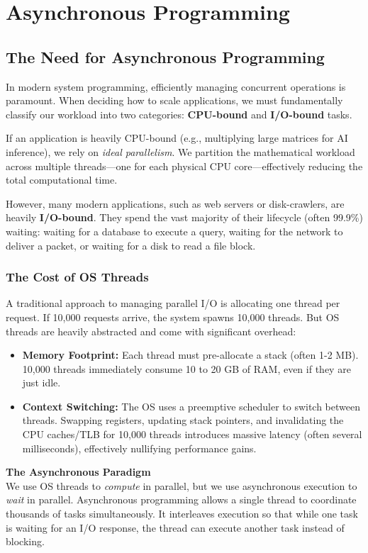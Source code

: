 \chapter{Asynchronous Programming}

\section{The Need for Asynchronous Programming}

In modern system programming, efficiently managing concurrent operations is paramount. When deciding how to scale applications, we must fundamentally classify our workload into two categories: \textbf{CPU-bound} and \textbf{I/O-bound} tasks.

If an application is heavily CPU-bound (e.g., multiplying large matrices for AI inference), we rely on \textit{ideal parallelism}. We partition the mathematical workload across multiple threads—one for each physical CPU core—effectively reducing the total computational time. 

However, many modern applications, such as web servers or disk-crawlers, are heavily \textbf{I/O-bound}. They spend the vast majority of their lifecycle (often 99.9\%) waiting: waiting for a database to execute a query, waiting for the network to deliver a packet, or waiting for a disk to read a file block.

\subsection{The Cost of OS Threads}
A traditional approach to managing parallel I/O is allocating one thread per request. If 10,000 requests arrive, the system spawns 10,000 threads. But OS threads are heavily abstracted and come with significant overhead:
\begin{itemize}
    \item \textbf{Memory Footprint:} Each thread must pre-allocate a stack (often 1-2 MB). 10,000 threads immediately consume 10 to 20 GB of RAM, even if they are just idle.
    \item \textbf{Context Switching:} The OS uses a preemptive scheduler to switch between threads. Swapping registers, updating stack pointers, and invalidating the CPU caches/TLB for 10,000 threads introduces massive latency (often several milliseconds), effectively nullifying performance gains.
\end{itemize}

\begin{insightbox}
\textbf{The Asynchronous Paradigm} \\
We use OS threads to \textit{compute} in parallel, but we use asynchronous execution to \textit{wait} in parallel. Asynchronous programming allows a single thread to coordinate thousands of tasks simultaneously. It interleaves execution so that while one task is waiting for an I/O response, the thread can execute another task instead of blocking.
\end{insightbox}

